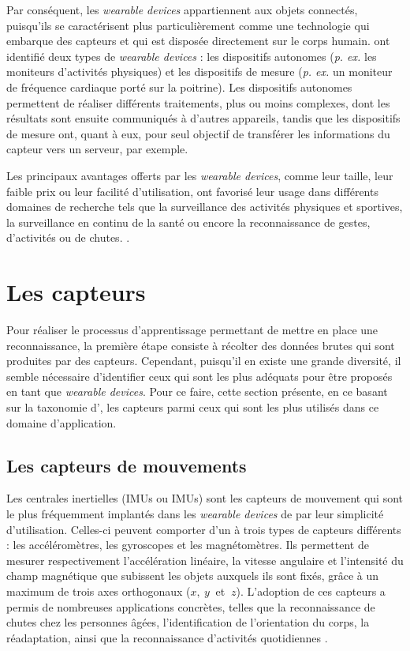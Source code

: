 Par conséquent, les \textit{wearable devices} appartiennent aux objets connectés, puisqu'ils se caractérisent plus particulièrement comme une technologie qui embarque des capteurs et qui est disposée directement sur le corps humain. \cite{Godfrey2018} ont identifié deux types de \textit{wearable devices} : les dispositifs autonomes (\textit{p. ex.} les moniteurs d'activités physiques) et les dispositifs de mesure (\textit{p. ex.} un moniteur de fréquence cardiaque porté sur la poitrine). Les dispositifs autonomes permettent de réaliser différents traitements, plus ou moins complexes, dont les résultats sont ensuite communiqués à d'autres appareils, tandis que les dispositifs de mesure ont, quant à eux, pour seul objectif de transférer les informations du capteur vers un serveur, par exemple.

Les principaux avantages offerts par les \textit{wearable devices}, comme leur taille, leur faible prix ou leur facilité d'utilisation, ont favorisé leur usage dans différents domaines de recherche tels que la surveillance des activités physiques et sportives, la surveillance en continu de la santé ou encore la reconnaissance de gestes, d'activités ou de chutes. \citep{Seon-WooLee2002, Istepanian2011, Garcia-Ceja2014, Bayat2014a, YuanJieFan2014, Gao2014a, Nielsen2014, Adib2015, Davis2016, Khan2016, Chapron2018}.

\section{Les capteurs}

Pour réaliser le processus d'apprentissage permettant de mettre en place une reconnaissance, la première étape consiste à récolter des données brutes qui sont produites par des capteurs. Cependant, puisqu'il en existe une grande diversité, il semble nécessaire d'identifier ceux qui sont les plus adéquats pour être proposés en tant que \textit{wearable devices}. Pour ce faire, cette section présente, en ce basant sur la taxonomie d'\cite{Acampora2013}, les capteurs parmi ceux qui sont les plus utilisés dans ce domaine d'application.

\subsection{Les capteurs de mouvements}

Les centrales inertielles (\aclp{IMU} ou \acsp{IMU}) sont les capteurs de mouvement qui sont le plus fréquemment implantés dans les \textit{wearable devices} de par leur simplicité d'utilisation. Celles-ci peuvent comporter d'un à trois types de capteurs différents : les accéléromètres, les gyroscopes et les magnétomètres. Ils permettent de mesurer respectivement l'accélération linéaire, la vitesse angulaire et l'intensité du champ magnétique que subissent les objets auxquels ils sont fixés, grâce à un maximum de trois axes orthogonaux ($x,\: y\: $ et $\: z$). L'adoption de ces capteurs a permis de nombreuses applications concrètes, telles que la reconnaissance de chutes chez les personnes âgées, l'identification de l'orientation du corps, la réadaptation, ainsi que la reconnaissance d'activités quotidiennes \citep{Seon-WooLee2002, Garcia-Ceja2014, Bayat2014a, Gao2014a, Davis2016, Chapron2018}.

